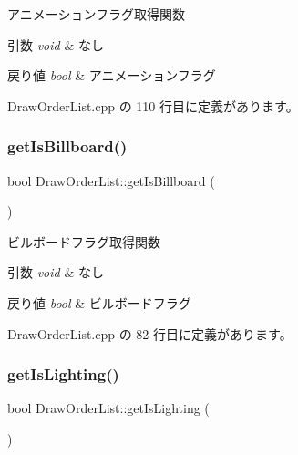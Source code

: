 アニメーションフラグ取得関数 


\begin{DoxyParams}{引数}
{\em void} & なし \\
\hline
\end{DoxyParams}

\begin{DoxyRetVals}{戻り値}
{\em bool} & アニメーションフラグ \\
\hline
\end{DoxyRetVals}


 Draw\+Order\+List.\+cpp の 110 行目に定義があります。

\mbox{\label{class_draw_order_list_a5d49272331a0f6f8656839ba5fe5e1b6}} 
\subsubsection{\texorpdfstring{get\+Is\+Billboard()}{getIsBillboard()}}
{\footnotesize\ttfamily bool Draw\+Order\+List\+::get\+Is\+Billboard (\begin{DoxyParamCaption}{ }\end{DoxyParamCaption})}



ビルボードフラグ取得関数 


\begin{DoxyParams}{引数}
{\em void} & なし \\
\hline
\end{DoxyParams}

\begin{DoxyRetVals}{戻り値}
{\em bool} & ビルボードフラグ \\
\hline
\end{DoxyRetVals}


 Draw\+Order\+List.\+cpp の 82 行目に定義があります。

\mbox{\label{class_draw_order_list_a1015463f08f8bf1118d5d1f79029d869}} 
\subsubsection{\texorpdfstring{get\+Is\+Lighting()}{getIsLighting()}}
{\footnotesize\ttfamily bool Draw\+Order\+List\+::get\+Is\+Lighting (\begin{DoxyParamCaption}{ }\end{DoxyParamCaption})}



